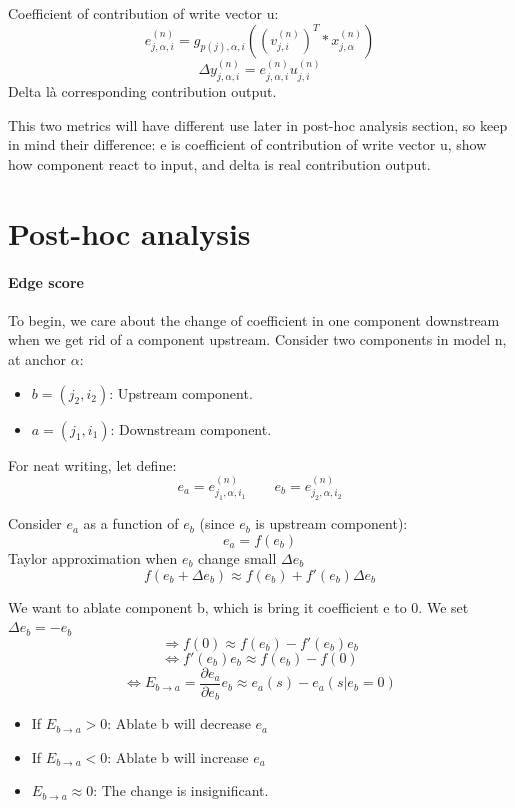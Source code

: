 \documentclass[11pt,a4paper]{article}
\begin{document}
Coefficient of contribution of write vector u:
$$
e_{j,\alpha,i}^{(n)} = g_{p(j), \alpha, i}((v_{j,i}^{(n)})^T * x_{j,\alpha}^{(n)})
$$
$$
\Delta y_{j,\alpha,i}^{(n)}
=
e_{j,\alpha,i}^{(n)}u_{j,i}^{(n)}
$$ Delta là corresponding contribution output.

This two metrics will have different use later in post-hoc analysis section, so keep in mind their difference: e is coefficient of contribution of write vector u, show how component react to input, and delta is real contribution output.

\section{Post-hoc analysis}

\paragraph {Edge score}
To begin, we care about the change of coefficient in one component downstream when we get rid of a component upstream.
Consider two components in model n, at anchor $\alpha$:
\begin{itemize}
\item $b = (j_2, i_2)$: Upstream component.
\item $a = (j_1, i_1)$: Downstream component.
\end{itemize}

For neat writing, let define:
$$
e_a = e^{(n)}_{j_1, \alpha, i_1}
\qquad
e_b = e^{(n)}_{j_2, \alpha, i_2}
$$

Consider $e_a$ as a function of $e_b$ (since $e_b$ is upstream component):
$$
e_a = f(e_b)
$$
Taylor approximation when $e_b$  change small $\Delta e_b$
$$
f(e_b + \Delta e_b) \approx f(e_b) + f'(e_b)\Delta e_b
$$

We want to ablate component b, which is bring it coefficient e to 0. We set $\Delta e_b = -e_b$
$$
\Rightarrow f(0) \approx f(e_b) - f'(e_b)e_b
$$
$$
\Leftrightarrow f'(e_b)e_b \approx f(e_b) - f(0)
$$
$$
\Leftrightarrow E_{b \rightarrow a} = \frac{\partial e_a} {\partial e_b} e_b \approx e_a(s) - e_a(s | e_b = 0)
$$

\begin{itemize}
\item If $E_{b \rightarrow a} > 0$: Ablate b will decrease $e_a$
\item  If $E_{b \rightarrow a} < 0$: Ablate b will increase $e_a$
\item  $E_{b \rightarrow a} \approx 0$: The change is insignificant.
\end{itemize}
\end{document}
